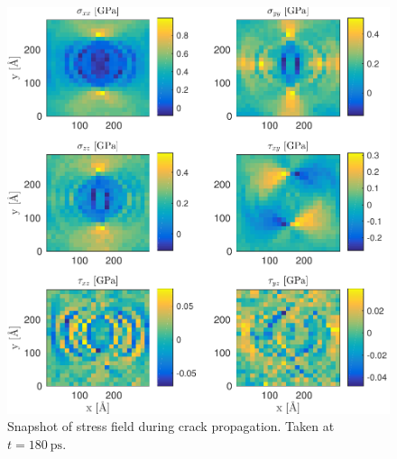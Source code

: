 \begin{figure}
\includegraphics[width=\textwidth]{../figures/thesis/stressfield_snap_propagation_180.pdf}
\caption{Snapshot of stress field during crack propagation. Taken at $t = \SI{180}{\pico\second}$.}
\end{figure}


